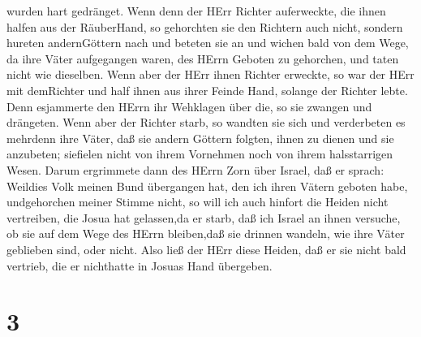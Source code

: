 wurden hart gedränget.  Wenn denn der HErr Richter
auferweckte, die ihnen halfen aus der RäuberHand,  so
gehorchten sie den Richtern auch nicht, sondern hureten andernGöttern
nach und beteten sie an und wichen bald von dem Wege, da ihre Väter
aufgegangen waren, des HErrn Geboten zu gehorchen, und taten nicht wie
dieselben.  Wenn aber der HErr ihnen Richter erweckte, so
war der HErr mit demRichter und half ihnen aus ihrer Feinde Hand,
solange der Richter lebte. Denn esjammerte den HErrn ihr Wehklagen über
die, so sie zwangen und drängeten.  Wenn aber der Richter
starb, so wandten sie sich und verderbeten es mehrdenn ihre Väter, daß
sie andern Göttern folgten, ihnen zu dienen und sie anzubeten; siefielen
nicht von ihrem Vornehmen noch von ihrem halsstarrigen Wesen.
 Darum ergrimmete dann des HErrn Zorn über Israel, daß er
sprach: Weildies Volk meinen Bund übergangen hat, den ich ihren Vätern
geboten habe, undgehorchen meiner Stimme nicht,  so will
ich auch hinfort die Heiden nicht vertreiben, die Josua hat gelassen,da
er starb,  daß ich Israel an ihnen versuche, ob sie auf dem
Wege des HErrn bleiben,daß sie drinnen wandeln, wie ihre Väter geblieben
sind, oder nicht.  Also ließ der HErr diese Heiden, daß er
sie nicht bald vertrieb, die er nichthatte in Josuas Hand übergeben.

\hypertarget{section-2}{%
\section{3}\label{section-2}}

